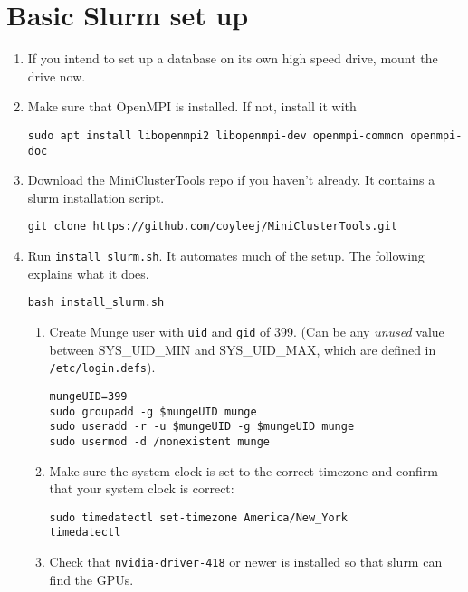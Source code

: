 \section{Basic Slurm set up} \label{sec:basicslurm}

\begin{enumerate}
\item If you intend to set up a database on its own high speed drive, mount the drive now. %

\item Make sure that OpenMPI is installed. If not, install it with

	\texttt{sudo apt install libopenmpi2 libopenmpi-dev openmpi-common openmpi-doc}

\item Download the \href{https://github.com/coyleej/MiniClusterTools}{MiniClusterTools repo}  if you haven't already. It contains a slurm installation script.

	\texttt{git clone https://github.com/coyleej/MiniClusterTools.git}

\item Run \texttt{install\_slurm.sh}. It automates much of the setup. The following explains what it does.

	\texttt{bash install\_slurm.sh}

	\begin{enumerate}
	\item Create Munge user with \texttt{uid} and \texttt{gid} of 399. (Can be any \emph{unused} value between SYS\_UID\_MIN and SYS\_UID\_MAX, which are defined in \texttt{/etc/login.defs}). 

		\texttt{mungeUID=399} \\
		\texttt{sudo groupadd -g \$mungeUID munge} \\
		\texttt{sudo useradd -r -u \$mungeUID -g \$mungeUID munge} \\
		\texttt{sudo usermod -d /nonexistent munge}

	\item Make sure the system clock is set to the correct timezone and confirm that your system clock is correct:

		\texttt{sudo timedatectl set-timezone America/New\_York} \\
		\texttt{timedatectl}

	\item Check that \texttt{nvidia-driver-418} or newer is installed so that slurm can find the GPUs.


\end{enumerate}
\end{enumerate}
